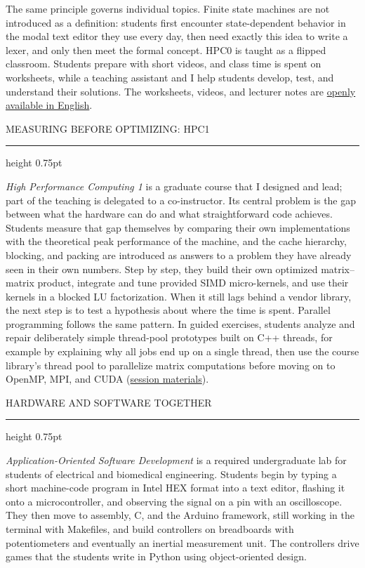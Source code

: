 \documentclass[10pt]{article}
\newcommand{\headsize}{\fontsize{10.5pt}{12.8pt}\selectfont}
\newcommand{\cvsection}[1]{%
  \par\vspace{8pt}%
  {\headsize\bfseries\color{heading}\strut#1\par}%
  \nopagebreak\vspace{1pt}%
  {\color{rule}\hrule height 0.75pt}%
  \nopagebreak\vspace{3pt}%
  \prevdepth=2.9pt\relax
}
\begin{document}
The same principle governs individual topics. Finite state machines are not introduced as a definition: students first encounter state-dependent behavior in the modal text editor they use every day, then need exactly this idea to write a lexer, and only then meet the formal concept. HPC0 is taught as a flipped classroom. Students prepare with short videos, and class time is spent on worksheets, while a teaching assistant and I help students develop, test, and understand their solutions. The worksheets, videos, and lecturer notes are \href{https://github.com/michael-lehn/not-abc/tree/main/hpc0-sessions}{openly available in English}.

\cvsection{MEASURING BEFORE OPTIMIZING: HPC1}

\emph{High Performance Computing 1} is a graduate course that I designed and lead; part of the teaching is delegated to a co-instructor. Its central problem is the gap between what the hardware can do and what straightforward code achieves. Students measure that gap themselves by comparing their own implementations with the theoretical peak performance of the machine, and the cache hierarchy, blocking, and packing are introduced as answers to a problem they have already seen in their own numbers. Step by step, they build their own optimized matrix–matrix product, integrate and tune provided SIMD micro-kernels, and use their kernels in a blocked LU factorization. When it still lags behind a vendor library, the next step is to test a hypothesis about where the time is spent. Parallel programming follows the same pattern. In guided exercises, students analyze and repair deliberately simple thread-pool prototypes built on C++ threads, for example by explaining why all jobs end up on a single thread, then use the course library's thread pool to parallelize matrix computations before moving on to OpenMP, MPI, and CUDA (\href{https://www.mathematik.uni-ulm.de/numerik/hpc/ws25/}{session materials}).

\cvsection{HARDWARE AND SOFTWARE TOGETHER}

\emph{Application-Oriented Software Development} is a required undergraduate lab for students of electrical and biomedical engineering. Students begin by typing a short machine-code program in Intel HEX format into a text editor, flashing it onto a microcontroller, and observing the signal on a pin with an oscilloscope. They then move to assembly, C, and the Arduino framework, still working in the terminal with Makefiles, and build controllers on breadboards with potentiometers and eventually an inertial measurement unit. The controllers drive games that the students write in Python using object-oriented design.
\end{document}
